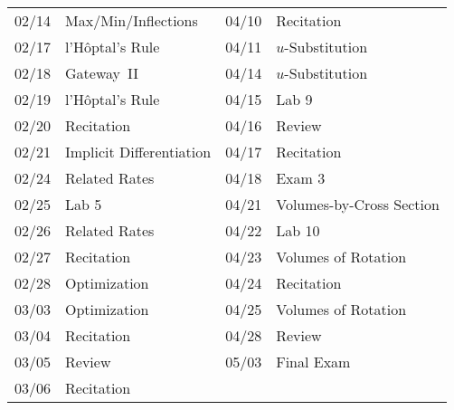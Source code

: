 \documentclass[11pt,letterpaper]{article}
\begin{document}
\begin{table}[!ht]
{\begin{tabular}{ll || ll}
	02/14 & Max/Min/Inflections & 04/10 & Recitation \\
	02/17 & l'H\^{o}ptal's Rule & 04/11 & $u$-Substitution \\
	02/18 & Gateway~II & 04/14 & $u$-Substitution \\
	02/19 & l'H\^{o}ptal's Rule &  04/15 & Lab 9 \\
	02/20 & Recitation & 04/16 & Review \\
	02/21 & Implicit Differentiation & 04/17 & Recitation \\
	02/24 & Related Rates & 04/18 & Exam 3 \\
	02/25 & Lab 5 & 04/21 & Volumes-by-Cross Section \\
	02/26 & Related Rates & 04/22 & Lab 10 \\
	02/27 & Recitation & 04/23 & Volumes of Rotation \\
	02/28 & Optimization & 04/24 & Recitation \\
	03/03 & Optimization & 04/25 & Volumes of Rotation \\
	03/04 & Recitation & 04/28 & Review \\
	03/05 & Review & 05/03 & Final Exam \\
	03/06 & Recitation & 
        \end{tabular}
        }
        \end{table}
\end{document}
